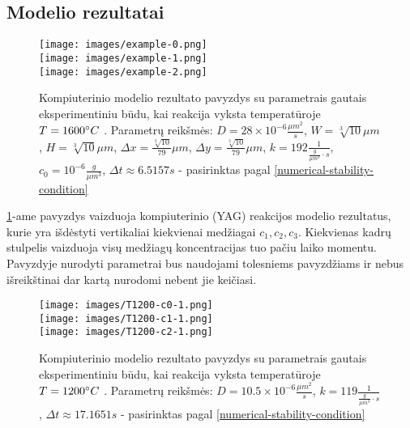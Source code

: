 \newpage
\subsection{Modelio rezultatai}

\begin{figure}[h!]
\centering
\texttt{[image: images/example-0.png]} \\ 
\texttt{[image: images/example-1.png]} \\
\texttt{[image: images/example-2.png]}

\caption{Kompiuterinio modelio rezultato pavyzdys su parametrais gautais eksperimentiniu būdu, kai reakcija vyksta temperatūroje $T=1600\degree C$ \cite{mackeviciusCloserLookComputer2012}. Parametrų reikšmės: $D = 28\times 10^{-6} \frac{\mu m^2}{s}$, $W = \sqrt[3]{10}\mu m$, $H = \sqrt[3]{10}\mu m$, $\Delta x = \frac{\sqrt[3]{10}}{79}\mu m$, $\Delta y = \frac{\sqrt[3]{10}}{79} \mu m$, $k = 192 \frac{1}{ \frac{g}{\mu m^3}\cdot s}$, $c_0 = 10^{-6} \frac{g}{\mu m^3}$, $\Delta t \approx 6.5157s$ - pasirinktas pagal \eqref{numerical-stability-condition} }

\label{result-example}
\end{figure}

\ref{result-example}-ame pavyzdys vaizduoja kompiuterinio (YAG) reakcijos modelio rezultatus, kurie yra išdėstyti vertikaliai kiekvienai medžiagai $c_1, c_2, c_3$. Kiekvienas kadrų stulpelis vaizduoja visų medžiagų koncentracijas tuo pačiu laiko momentu. Pavyzdyje nurodyti parametrai bus naudojami tolesniems pavyzdžiams ir nebus išreikštinai dar kartą nurodomi nebent jie keičiasi.

\newpage

\begin{figure}[h!]
\centering
\texttt{[image: images/T1200-c0-1.png]} \\ 
\texttt{[image: images/T1200-c1-1.png]}  \\
\texttt{[image: images/T1200-c2-1.png]} 

\caption{Kompiuterinio modelio rezultato pavyzdys su parametrais gautais eksperimentiniu būdu, kai reakcija vyksta temperatūroje $T=1200\degree C$ \cite{mackeviciusCloserLookComputer2012}. Parametrų reikšmės: $D = 10.5\times 10^{-6} \frac{\mu m^2}{s}$, $k = 119 \frac{1}{ \frac{g}{\mu m^3}\cdot s}$, $\Delta t \approx 17.1651s$ - pasirinktas pagal \eqref{numerical-stability-condition} }

\label{alternate-result-example}
\end{figure}

